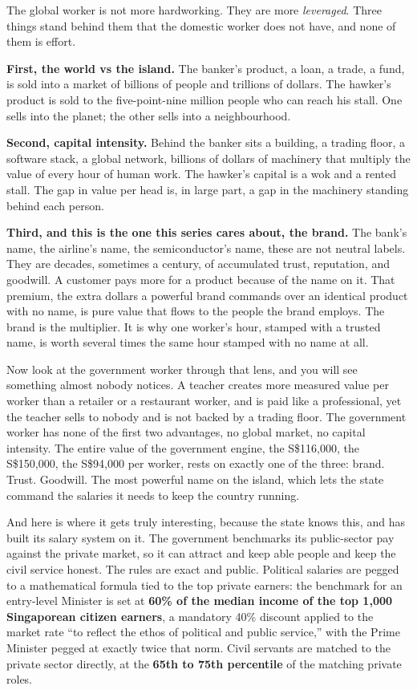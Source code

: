 \documentclass[10pt,twoside,openany]{memoir}
\begin{document}
{{{{The global worker is not more hardworking. They are more
\emph{leveraged}. Three things stand behind them that the domestic
worker does not have, and none of them is effort.

\textbf{First, the world vs the island.} The banker's product, a loan, a
trade, a fund, is sold into a market of billions of people and trillions
of dollars. The hawker's product is sold to the five-point-nine million
people who can reach his stall. One sells into the planet; the other
sells into a neighbourhood.

\textbf{Second, capital intensity.} Behind the banker sits a building, a
trading floor, a software stack, a global network, billions of dollars
of machinery that multiply the value of every hour of human work. The
hawker's capital is a wok and a rented stall. The gap in value per head
is, in large part, a gap in the machinery standing behind each person.

\textbf{Third, and this is the one this series cares about, the brand.}
The bank's name, the airline's name, the semiconductor's name, these are
not neutral labels. They are decades, sometimes a century, of
accumulated trust, reputation, and goodwill. A customer pays more for a
product because of the name on it. That premium, the extra dollars a
powerful brand commands over an identical product with no name, is pure
value that flows to the people the brand employs. The brand is the
multiplier. It is why one worker's hour, stamped with a trusted name, is
worth several times the same hour stamped with no name at all.

Now look at the government worker through that lens, and you will see
something almost nobody notices. A teacher creates more measured value
per worker than a retailer or a restaurant worker, and is paid like a
professional, yet the teacher sells to nobody and is not backed by a
trading floor. The government worker has none of the first two
advantages, no global market, no capital intensity. The entire value of
the government engine, the S\$116,000, the S\$150,000, the S\$94,000 per
worker, rests on exactly one of the three: brand. Trust. Goodwill. The
most powerful name on the island, which lets the state command the
salaries it needs to keep the country running.

And here is where it gets truly interesting, because the state knows
this, and has built its salary system on it. The government benchmarks
its public-sector pay against the private market, so it can attract and
keep able people and keep the civil service honest. The rules are exact
and public. Political salaries are pegged to a mathematical formula tied
to the top private earners: the benchmark for an entry-level Minister is
set at \textbf{60\% of the median income of the top 1,000 Singaporean
citizen earners}, a mandatory 40\% discount applied to the market rate
``to reflect the ethos of political and public service,'' with the Prime
Minister pegged at exactly twice that norm. Civil servants are matched
to the private sector directly, at the \textbf{65th to 75th percentile}
of the matching private roles.

}}}}
\end{document}
